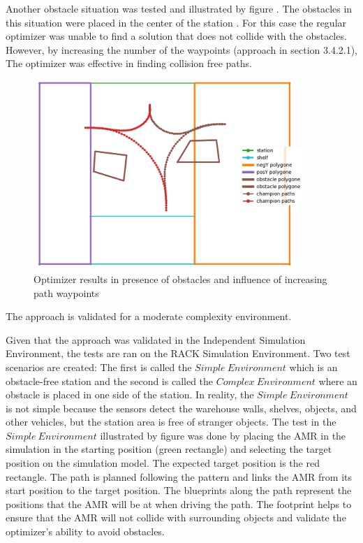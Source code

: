 Another obstacle situation was tested and illustrated by figure .
The obstacles in this situation were placed in the center of the station . 
For this case the regular optimizer was unable to find a solution that does not collide 
with the obstacles. However, by increasing the number of the waypoints (approach in section 3.4.2.1),
The optimizer was effective in finding collision free paths. 


\begin{figure}[H]
    \begin{center}
        \includegraphics[width=4in]{images/Chap3/Figure_6.png} %
        \caption{Optimizer results in presence of obstacles and influence of increasing path waypoints}
        \label{OptResult3}
        \end{center}    
\end{figure}

The approach is validated for a moderate complexity environment.

Given that the approach was validated in the Independent Simulation Environment, the tests are 
ran on the RACK Simulation Environment. Two test scenarios are created: 
The first is called the \(Simple~Environment\) which is an obstacle-free station and the second is
called the \(Complex~Environment\) where an obstacle is placed in one side of the station. 
In reality, the \(Simple~Environment\) is not simple because the sensors detect the warehouse walls,
shelves, objects, and other vehicles, but the station area is free of stranger objects.
The test in the \(Simple~Environment\) illustrated by figure  was done by placing the 
AMR in the simulation in the starting position (green rectangle) and selecting the target position on 
the simulation model. The expected target position is the red rectangle. 
The path is planned following the pattern and links the AMR from its start position to the target position.
The blueprints along the path represent the positions that the AMR will be at when driving the path.
The footprint helps to ensure that the AMR will not collide with surrounding objects and 
validate the optimizer's ability to avoid obstacles. 

